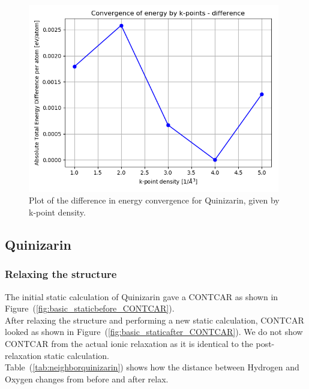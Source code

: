 \documentclass{article}
\begin{document}
    \begin{figure}[H]
        \centering
        \includegraphics[width = 11cm]{../fig/convergence_kpoints_difference.png}
        \caption{Plot of the difference in energy convergence for Quinizarin, given by k-point density. }
        \label{fig:convergence_kpoints_difference}
    \end{figure}

    \vspace{1cm}

  \subsection{Quinizarin}

    \subsubsection{Relaxing the structure}

      The initial static calculation of Quinizarin gave a CONTCAR as shown in Figure~(\ref{fig:basic_staticbefore_CONTCAR}). \\

      After relaxing the structure and performing a new static calculation, CONTCAR looked as shown in Figure~(\ref{fig:basic_staticafter_CONTCAR}). We do not show CONTCAR from the actual ionic relaxation as it is identical to the post-relaxation static calculation. \\

      Table~(\ref{tab:neighborquinizarin}) shows how the distance between Hydrogen and Oxygen changes from before and after relax. \\
\end{document}
